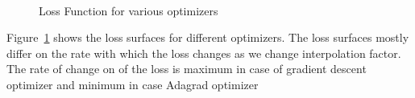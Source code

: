 \documentclass[12pt]{report}
\begin{document}
\begin{figure}[H]
	\\
	\caption{Loss Function for various optimizers}
	\label{fig:2}
\end{figure}

Figure~\ref{fig:2} shows the loss surfaces for different optimizers. The loss surfaces mostly differ on the rate with which the loss changes as we change interpolation factor. The rate of change on of the loss is maximum in case of gradient descent optimizer and minimum in case Adagrad optimizer
\end{document}
